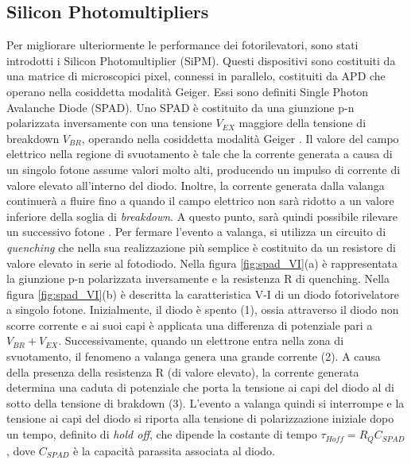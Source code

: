 \subsection{Silicon Photomultipliers}
Per migliorare ulteriormente le performance dei fotorilevatori, sono stati introdotti i Silicon Photomultiplier (SiPM). Questi dispositivi sono costituiti da una matrice di microscopici pixel, connessi in parallelo, costituiti da APD che operano nella cosiddetta modalità Geiger. Essi sono definiti Single Photon Avalanche Diode (SPAD). Uno SPAD è costituito da una giunzione p-n polarizzata inversamente con una tensione $V_{EX}$ maggiore della tensione di breakdown $V_{BR}$, operando nella cosiddetta modalità Geiger \cite{Jiang2019}. Il valore del campo elettrico nella regione di svuotamento è tale che la corrente generata a causa di un singolo fotone assume valori molto alti, producendo un impulso di corrente di valore elevato all'interno del diodo. Inoltre, la corrente generata dalla valanga continuerà a fluire fino a quando il campo elettrico non sarà ridotto a un valore inferiore della soglia di \textit{breakdown}. A questo punto, sarà quindi possibile rilevare un successivo fotone \cite{Palubiak2011}. Per fermare l'evento a valanga, si utilizza un circuito di \textit{quenching} che nella sua realizzazione più semplice è costituito da un resistore di valore elevato in serie al fotodiodo. Nella figura \ref{fig:spad_VI}(a) è rappresentata la giunzione p-n polarizzata inversamente e la resistenza R di quenching. Nella figura \ref{fig:spad_VI}(b) è descritta la caratteristica V-I di un diodo fotorivelatore a singolo fotone. Inizialmente, il diodo è spento (1), ossia attraverso il diodo non scorre corrente e ai suoi capi è applicata una differenza di potenziale pari a $V_{BR}+V_{EX}$. Successivamente, quando un elettrone entra nella zona di svuotamento, il fenomeno a valanga genera una grande corrente (2). A causa della presenza della resistenza R (di valore elevato), la corrente generata determina una caduta di potenziale che porta la tensione ai capi del diodo al di sotto della tensione di brakdown (3). L'evento a valanga quindi si interrompe e la tensione ai capi del diodo si riporta alla tensione di polarizzazione iniziale dopo un tempo, definito di \textit{hold off}, che dipende la costante di tempo $\tau_{Hoff}=R_QC_{SPAD}$, dove $C_{SPAD}$ è la capacità parassita associata al diodo.

